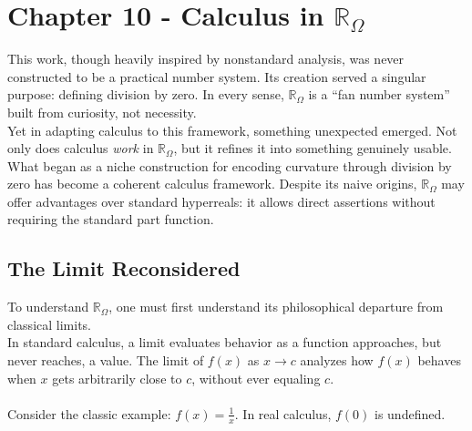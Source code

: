 \documentclass{article}
\begin{document}
\newpage
\section{Chapter 10 - Calculus in $\mathbb{R}_\Omega$}

This work, though heavily inspired by nonstandard analysis, was never constructed to be a practical number system. Its creation served a singular purpose: defining division by zero. In every sense, $\mathbb{R}_\Omega$ is a ``fan number system'' built from curiosity, not necessity.\\Yet in adapting calculus to this framework, something unexpected emerged. Not only does calculus \textit{work} in $\mathbb{R}_\Omega$, but it refines it into something genuinely usable. What began as a niche construction for encoding curvature through division by zero has become a coherent calculus framework. Despite its naive origins, $\mathbb{R}_\Omega$ may offer advantages over standard hyperreals: it allows direct assertions without requiring the standard part function.

\subsection{The Limit Reconsidered}

To understand $\mathbb{R}_\Omega$, one must first understand its philosophical departure from classical limits.\\In standard calculus, a limit evaluates behavior as a function approaches, but never reaches, a value. The limit of $f(x)$ as $x \to c$ analyzes how $f(x)$ behaves when $x$ gets arbitrarily close to $c$, without ever equaling $c$.\\\\Consider the classic example: $f(x) = \frac{1}{x}$. In real calculus, $f(0)$ is undefined.
\end{document}
